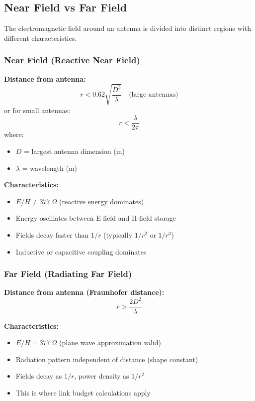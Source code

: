 \subsection{Near Field vs Far Field}

The electromagnetic field around an antenna is divided into distinct regions with different characteristics.

\subsubsection{Near Field (Reactive Near Field)}

\textbf{Distance from antenna:}
\begin{equation}
r < 0.62\sqrt{\frac{D^3}{\lambda}} \quad \text{(large antennas)}
\label{eq:near-field-distance}
\end{equation}
or for small antennas:
\begin{equation}
r < \frac{\lambda}{2\pi}
\label{eq:near-field-small}
\end{equation}
where:
\begin{itemize}
\item $D$ = largest antenna dimension (m)
\item $\lambda$ = wavelength (m)
\end{itemize}

\textbf{Characteristics:}
\begin{itemize}
\item $E/H \neq 377~\Omega$ (reactive energy dominates)
\item Energy oscillates between E-field and H-field storage
\item Fields decay faster than $1/r$ (typically $1/r^2$ or $1/r^3$)
\item Inductive or capacitive coupling dominates
\end{itemize}

\subsubsection{Far Field (Radiating Far Field)}

\textbf{Distance from antenna (Fraunhofer distance):}
\begin{equation}
r > \frac{2D^2}{\lambda}
\label{eq:far-field-distance}
\end{equation}

\textbf{Characteristics:}
\begin{itemize}
\item $E/H = 377~\Omega$ (plane wave approximation valid)
\item Radiation pattern independent of distance (shape constant)
\item Fields decay as $1/r$, power density as $1/r^2$
\item This is where link budget calculations apply
\end{itemize}

